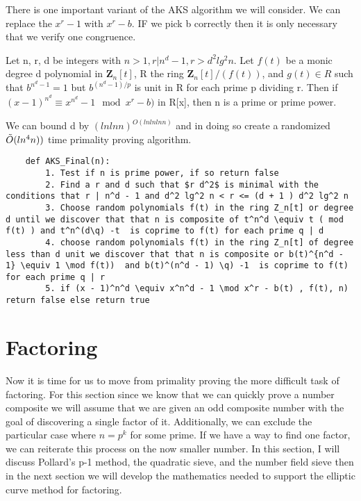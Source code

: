 \documentclass{article}
\begin{document}
There is one important variant of the AKS algorithm we will consider. We can replace the $x^r - 1$ with $x^r - b$. IF we pick b correctly then it is only necessary that we verify one congruence. 
\begin{theorem}
    Let n, r, d be integers with $n  > 1, r | n^d - 1, r > d^2 lg^2 n$. Let $f(t)$ be a monic degree d polynomial in $\textbf{Z}_n [t]$, R the ring $\textbf{Z}_n [t] / (f(t))$, and $ g(t) \in R$ such that $b^{n^{d} -1} = 1$ but  $b^{(n^{d} -1) / p} $ is unit in R for each prime p dividing r. Then if $( x - 1)^{n^d} \equiv x^{n^d} - 1 \mod x^r -b )$ in R[x], then n is a prime or prime power. 
\end{theorem}\cite{gucciniefficient}
We can bound d by $(ln ln n)^{O ( ln ln ln n)}$ and in doing so create a randomized $\tilde{O}(ln^4 n))$ time  primality proving algorithm. 
\begin{verbatim}
    def AKS_Final(n):
        1. Test if n is prime power, if so return false
        2. Find a r and d such that $r d^2$ is minimal with the conditions that r | n^d - 1 and d^2 lg^2 n < r <= (d + 1 ) d^2 lg^2 n
        3. Choose random polynomials f(t) in the ring Z_n[t] or degree d until we discover that that n is composite of t^n^d \equiv t ( mod f(t) ) and t^n^(d\q) -t  is coprime to f(t) for each prime q | d
        4. choose random polynomials f(t) in the ring Z_n[t] of degree less than d unit we discover that that n is composite or b(t)^{n^d - 1} \equiv 1 \mod f(t))  and b(t)^(n^d - 1) \q) -1  is coprime to f(t) for each prime q | r
        5. if (x - 1)^n^d \equiv x^n^d - 1 \mod x^r - b(t) , f(t), n) return false else return true
\end{verbatim} 

\section{Factoring}
Now it is time for us to move from primality proving the more difficult task of factoring. For this section since we know that we can quickly prove a number composite we will assume that we are given an odd composite number with the goal of discovering a single factor of it. Additionally, we can exclude the particular case where $n = p^k$ for some prime. If we have a way to find one factor, we can reiterate this process on the now smaller number. In this section, I will discuss Pollard's p-1 method, the quadratic sieve, and the number field sieve then in the next section we will develop the mathematics needed to support the elliptic curve method for factoring. 
\end{document}
